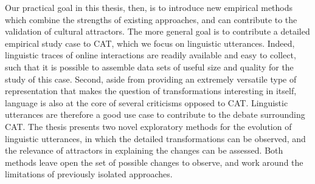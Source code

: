 \documentclass[english,]{article}
\begin{document}
Our practical goal in this thesis, then, is to introduce new empirical methods which combine the strengths of existing approaches, and can contribute to the validation of cultural attractors.
The more general goal is to contribute a detailed empirical study case to CAT, which we focus on linguistic utterances.
Indeed, linguistic traces of online interactions are readily available and easy to collect, such that it is possible to assemble data sets of useful size and quality for the study of this case.
Second, aside from providing an extremely versatile type of representation that makes the question of transformations interesting in itself, language is also at the core of several criticisms opposed to CAT.
Linguistic utterances are therefore a good use case to contribute to the debate surrounding CAT.
The thesis presents two novel exploratory methods for the evolution of linguistic utterances, in which the detailed transformations can be observed, and the relevance of attractors in explaining the changes can be assessed.
Both methods leave open the set of possible changes to observe, and work around the limitations of previously isolated approaches.
\end{document}
